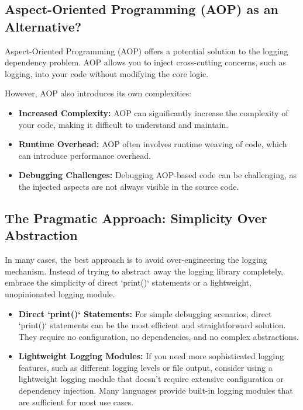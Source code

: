 \documentclass{article}
\begin{document}
{{{{\subsection*{Aspect-Oriented Programming (AOP) as an Alternative?}

Aspect-Oriented Programming (AOP) offers a potential solution to the logging dependency problem. AOP allows you to inject cross-cutting concerns, such as logging, into your code without modifying the core logic.

However, AOP also introduces its own complexities:

\begin{itemize}
    \item \textbf{Increased Complexity:}  AOP can significantly increase the complexity of your code, making it difficult to understand and maintain.
    \item \textbf{Runtime Overhead:}  AOP often involves runtime weaving of code, which can introduce performance overhead.
    \item \textbf{Debugging Challenges:}  Debugging AOP-based code can be challenging, as the injected aspects are not always visible in the source code.
\end{itemize}

\subsection*{The Pragmatic Approach: Simplicity Over Abstraction}

In many cases, the best approach is to avoid over-engineering the logging mechanism.  Instead of trying to abstract away the logging library completely, embrace the simplicity of direct `print()` statements or a lightweight, unopinionated logging module.

\begin{itemize}
    \item \textbf{Direct `print()` Statements:}  For simple debugging scenarios, direct `print()` statements can be the most efficient and straightforward solution.  They require no configuration, no dependencies, and no complex abstractions.
    \item \textbf{Lightweight Logging Modules:}  If you need more sophisticated logging features, such as different logging levels or file output, consider using a lightweight logging module that doesn't require extensive configuration or dependency injection.  Many languages provide built-in logging modules that are sufficient for most use cases.
\end{itemize}

}}}}
\end{document}
